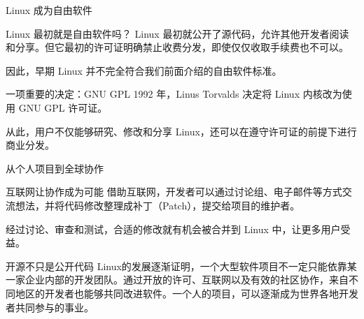 \documentclass[aspectratio=169]{beamer}
\begin{document}
\begin{frame}{Linux 成为自由软件}
	\begin{block}{Linux 最初就是自由软件吗？}
		\hspace*{2em}Linux 最初就公开了源代码，允许其他开发者阅读和分享。但它最初的许可证明确禁止收费分发，即使仅仅收取手续费也不可以。
		\par\hspace*{2em}因此，早期 Linux 并不完全符合我们前面介绍的自由软件标准。
	\end{block}
	\pause	
	\begin{block}{一项重要的决定：GNU GPL}
		\hspace*{2em}1992 年，Linus Torvalds 决定将 Linux 内核改为使用 GNU GPL 许可证。
		\par\hspace*{2em}从此，用户不仅能够研究、修改和分享 Linux，还可以在遵守许可证的前提下进行商业分发。
	\end{block}
\end{frame}


\begin{frame}{从个人项目到全球协作}
	
	\begin{block}{互联网让协作成为可能}
		\hspace*{2em}借助互联网，开发者可以通过讨论组、电子邮件等方式交流想法，并将代码修改整理成补丁（Patch），提交给项目的维护者。
		
		\par\hspace*{2em}经过讨论、审查和测试，合适的修改就有机会被合并到 Linux 中，让更多用户受益。
	\end{block}

	\begin{block}{开源不只是公开代码}
		\hspace*{2em}Linux的发展逐渐证明，一个大型软件项目不一定只能依靠某一家企业内部的开发团队。通过开放的许可、互联网以及有效的社区协作，来自不同地区的开发者也能够共同改进软件。\alert{一个人的项目，可以逐渐成为世界各地开发者共同参与的事业。}
	\end{block}
\end{frame}
\end{document}
